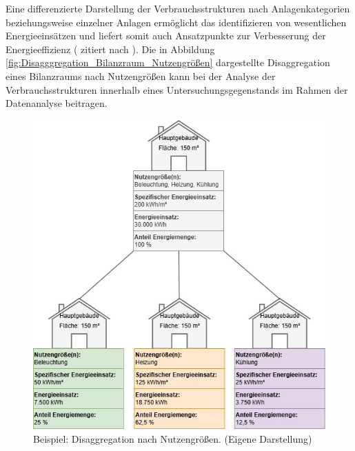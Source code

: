 Eine differenzierte Darstellung der Verbrauchsstrukturen nach Anlagenkategorien beziehungsweise einzelner Anlagen ermöglicht das identifizieren von 
wesentlichen Energieeinsätzen und liefert somit auch Ansatzpunkte zur Verbesserung der Energieeffizienz (\cite{Fink.1997} zitiert nach \cite[S. 8]{Hohnhold.2013}).
Die in Abbildung \eqref{fig:Disagggregation_Bilanzraum_Nutzengrößen} dargestellte Disaggregation eines Bilanzraums nach Nutzengrößen kann bei der Analyse der 
Verbrauchsstrukturen innerhalb eines Untersuchungsgegenstands im Rahmen der Datenanalyse beitragen.

\begin{figure}[H]
    \centering
    \includegraphics[width=1\textwidth]{../../Ressourcen/Abbildungen/Nutzengröße_Bewertungseinheit_Zerlegt_Beispiel.jpg}
    \caption{Beispiel: Disaggregation nach Nutzengrößen. (Eigene Darstellung)}
    \label{fig:Disagggregation_Bilanzraum_Nutzengrößen_Beispiel}
\end{figure}


